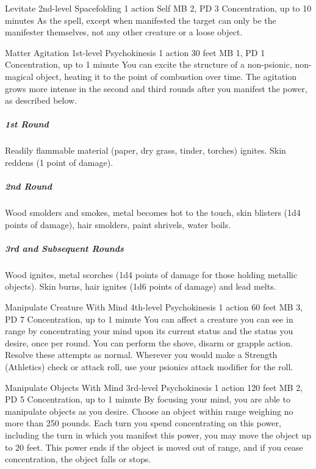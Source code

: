 \DndPowerHeader%
  {Levitate}
  {2nd-level Spacefolding}
  {1 action}
  {Self}
  {MB 2, PD 3}
  {Concentration, up to 10 minutes}
As the  spell,
except when manifested the target can only be the manifester themselves,
not any other creature or a loose object.

\DndPowerHeader%
  {Matter Agitation}
  {1st-level Psychokinesis}
  {1 action}
  {30 feet}
  {MB 1, PD 1}
  {Concentration, up to 1 minute}
  You can excite the structure of a non-psionic,
  non-magical object,
  heating it to the point of combustion over time.
  The agitation grows more intense in the second and third rounds
  after you manifest the power, as described below.

  \subparagraph{1st Round}
    Readily flammable material
    (paper, dry grass, tinder, torches) ignites.
    Skin reddens (1 point of damage).
  \subparagraph{2nd Round}
    Wood smolders and smokes,
    metal becomes hot to the touch,
    skin blisters (1d4 points of damage),
    hair smolders, paint shrivels, water boils.
  \subparagraph{3rd and Subsequent Rounds}
    Wood ignites, metal scorches
    (1d4 points of damage for those holding metallic objects).
    Skin burns, hair ignites (1d6 points of damage) and lead melts.

\DndPowerHeader%
  {Manipulate Creature With Mind}
  {4th-level Psychokinesis}
  {1 action}
  {60 feet}
  {MB 3, PD 7}
  {Concentration, up to 1 minute}
You can affect a creature you can see in range by
concentrating your mind upon its current status
and the status you desire, once per round.
You can perform the shove, disarm or grapple action.
Resolve these attempts as normal.
Wherever you would make a Strength (Athletics) check or attack roll,
use your psionics attack modifier for the roll.
  
  \DndPowerHeader%
    {Manipulate Objects With Mind}
    {3rd-level Psychokinesis}
    {1 action}
    {120 feet}
    {MB 2, PD 5}
    {Concentration, up to 1 minute}
  By focusing your mind, you are able to manipulate objects as you desire.
  Choose an object within range weighing no more than 250 pounds.
  Each turn you spend concentrating on this power,
  including the turn in which you manifest this power,
  you may move the object up to 20 feet.
  This power ends if the object is moved out of range,
  and if you cease concentration,
  the object falls or stops.

